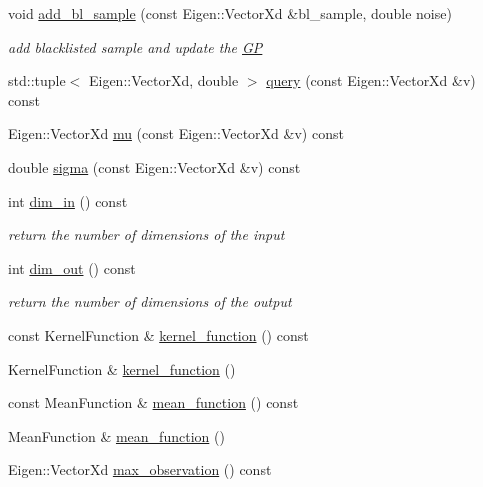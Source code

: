 \begin{DoxyCompactItemize}
void \hyperlink{classlimbo_1_1model_1_1_g_p_a43b06658ba27a37e12c1addce9ab8569}{add\+\_\+bl\+\_\+sample} (const Eigen\+::\+Vector\+Xd \&bl\+\_\+sample, double noise)
\begin{DoxyCompactList}\small\item\em add blacklisted sample and update the \hyperlink{classlimbo_1_1model_1_1_g_p}{G\+P} \end{DoxyCompactList}\item 
std\+::tuple$<$ Eigen\+::\+Vector\+Xd, double $>$ \hyperlink{classlimbo_1_1model_1_1_g_p_a33937ff7df97c01fdd9bf8911e0a6159}{query} (const Eigen\+::\+Vector\+Xd \&v) const 
\item 
Eigen\+::\+Vector\+Xd \hyperlink{classlimbo_1_1model_1_1_g_p_a5d26e30b8c53400cdf12058d83dc41f0}{mu} (const Eigen\+::\+Vector\+Xd \&v) const 
\item 
double \hyperlink{classlimbo_1_1model_1_1_g_p_a2ea153c1de2021740235cfa10822395d}{sigma} (const Eigen\+::\+Vector\+Xd \&v) const 
\item 
int \hyperlink{classlimbo_1_1model_1_1_g_p_a41d99e6a69d53fc7d9260d295f787bc3}{dim\+\_\+in} () const 
\begin{DoxyCompactList}\small\item\em return the number of dimensions of the input \end{DoxyCompactList}\item 
int \hyperlink{classlimbo_1_1model_1_1_g_p_a077144695f9f0b33b64d4feb8fb4e447}{dim\+\_\+out} () const 
\begin{DoxyCompactList}\small\item\em return the number of dimensions of the output \end{DoxyCompactList}\item 
const Kernel\+Function \& \hyperlink{classlimbo_1_1model_1_1_g_p_aaf794227fb4b8ba92bc22f15ec379d87}{kernel\+\_\+function} () const 
\item 
Kernel\+Function \& \hyperlink{classlimbo_1_1model_1_1_g_p_a442ffded72288fd9ea360ce1456f72a4}{kernel\+\_\+function} ()
\item 
const Mean\+Function \& \hyperlink{classlimbo_1_1model_1_1_g_p_a29be4dfec28fbf0ab970529a18a20c34}{mean\+\_\+function} () const 
\item 
Mean\+Function \& \hyperlink{classlimbo_1_1model_1_1_g_p_ad4a56a3630793def38840ea1c85c091e}{mean\+\_\+function} ()
\item 
Eigen\+::\+Vector\+Xd \hyperlink{classlimbo_1_1model_1_1_g_p_a480f1b249edf89bc6960512e8baceab8}{max\+\_\+observation} () const 

\end{DoxyCompactItemize}
